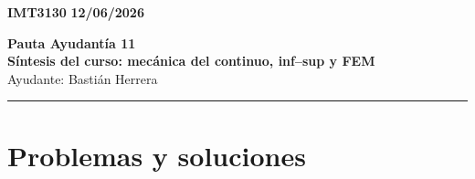 \documentclass[11pt]{article}
\begin{document}
    \begin{flushleft}
        \small
        \vspace{1pt}
        \textbf{IMT3130} \hfill
        \textbf{12/06/2026}
    \end{flushleft}
    \begin{center}
        \LARGE\textbf{Pauta Ayudantía 11}\\
        \vspace{3pt}
        \normalsize\textbf{Síntesis del curso: mecánica del continuo, inf--sup y FEM}\\
        \normalsize Ayudante: Bastián Herrera 
        \rule{\textwidth}{0.05mm}
    \end{center}

\section*{Problemas y soluciones}
\end{document}
